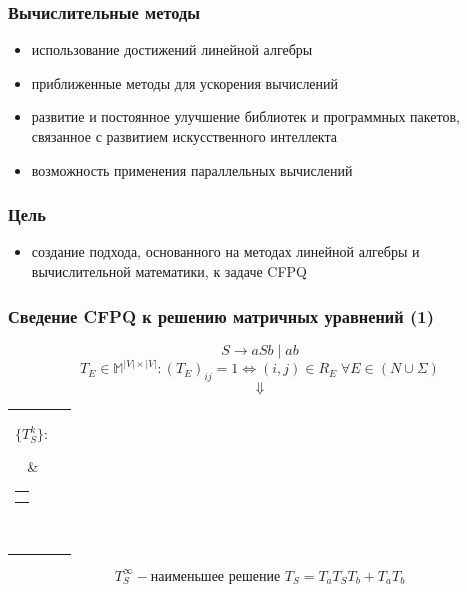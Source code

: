 \documentclass[xcolor=table]{beamer}
\begin{document}
\begin{frame}[fragile]
  \transwipe[direction=90]
  \frametitle{Вычислительные методы}
\begin{itemize}
  \item использование достижений линейной алгебры
  \item приближенные методы для ускорения вычислений
  \item развитие и постоянное улучшение библиотек и программных пакетов, связанное с развитием искусственного интеллекта 
  \item возможность применения параллельных вычислений
\end{itemize}
\end{frame}

\begin{frame}[fragile]
  \transwipe[direction=90]
  \frametitle{Цель}
\begin{itemize}
  \item создание подхода, основанного на методах линейной алгебры и вычислительной математики, к задаче CFPQ
\end{itemize}



\end{frame}


\begin{frame}[fragile]
  \transwipe[direction=90]
  \frametitle{Сведение CFPQ к решению матричных уравнений (1)}
  
  $$S \rightarrow aSb \mid ab$$
  $$T_E \in \mathbb{M}^{|V| \times |V|}: (T_{E})_{ij} = 1 \iff (i,j) \in R_E \; \forall E \in (N \cup \Sigma)$$
  \pause
  $$\Downarrow$$
    \centering
    \begin{tabular}{cl}
    \parbox{0.07\linewidth}{
    $$\{ T_S^k \}:$$
    }
    & \begin{tabular}{l}
    $T_S^0 = \mathbf{0}$ \\
    $T_S^{k+1} = T_a T_S^k T_b + T_a T_b$
    \end{tabular} \\
    \end{tabular}

  $$T_S^{\infty} - \texttt{наименьшее решение } T_S = T_aT_ST_b + T_aT_b$$

\end{frame}
\end{document}
